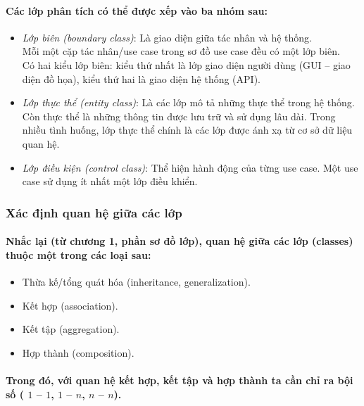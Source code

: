 \documentclass{article}
\begin{document}
      \paragraph{\textnormal{
        Các lớp phân tích có thể được xếp vào ba nhóm sau:
      }}
      \begin{itemize}
        \item \textit{Lớp biên (boundary class)}: Là giao diện giữa tác nhân và hệ thống.\\
        Mỗi một cặp tác nhân/use case trong sơ đồ use case đều có một lớp biên.\\
        Có hai kiểu lớp biên: kiểu thứ nhất là lớp giao diện người dùng (GUI -- giao diện đồ họa), kiểu thứ hai là giao diện hệ thống (API).
        \item \textit{Lớp thực thể (entity class)}: Là các lớp mô tả những thực thể trong hệ thống. Còn thực thể là những thông tin được lưu trữ và sử dụng lâu dài. Trong nhiều tình huống, lớp thực thể chính là các lớp được ánh xạ từ cơ sở dữ liệu quan hệ.
        \item \textit{Lớp điều kiện (control class)}: Thể hiện hành động của từng use case. Một use case sử dụng ít nhất một lớp điều khiển.
      \end{itemize}

    \subsubsection{Xác định quan hệ giữa các lớp}

    \paragraph{\textnormal{
      Nhắc lại (từ chương 1, phần sơ đồ lớp), quan hệ giữa các lớp (classes) thuộc một trong các loại sau:
    }}
    \begin{itemize}
      \item Thừa kế/tổng quát hóa (inheritance, generalization).
      \item Kết hợp (association).
      \item Kết tập (aggregation).
      \item Hợp thành (composition).
    \end{itemize}

    \paragraph{\textnormal{
      Trong đó, với quan hệ kết hợp, kết tập và hợp thành ta cần chỉ ra bội số ( $1$ -- $1$, $1$ -- $n$, $n$ -- $n$).
    }}
\end{document}
